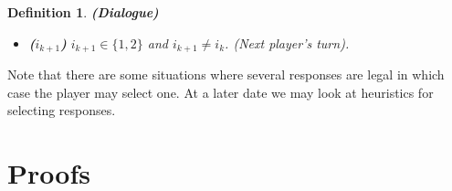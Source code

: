 \documentclass{blue-book}
\newtheorem{definition}{Definition}
\newcommand{\drule}[3]{\ensuremath{#1:#2 \rightarrow #3}}
\begin{document}
\begin{definition}{\bf (Dialogue)}
\begin{itemize}
\begin{enumerate}
\begin{itemize}
\item there exists a $T \in {\cal T}_{i_k}$ such that $t$ is unprovable in $T$ and,
\item $t \in Y_{{i_k}j}$  (Player ${i_k}$ identifies a term $t$ that it does not believe and it has established the other does  and asks why).
\end{itemize}
\item $stmt_{k + 1} = \mathit{different\_fact}(t, j, {i_k})$ is legal iff $t \in F_{{i_k}j}$ and $t \not\in F_{i_k}$ (Player ${i_k}$ has identified that $t$ was an initial fact for Player $j$ but not for Player ${i_k}$)
\item $stmt_{k + 1} = \mathit{different\_fact}(t, {i_k}, j)$ is legal iff  $t \in N_{{i_k}j}$ and $t \in F_{i_k}$  (Player ${i_k}$ has identified that $t$ was an initial fact for Player ${i_k}$ but not for Player $j$)
\item $stmt_{k+1} = \mathit{different\_rule}(l, j, {i_k})$ is legal iff $l \in YR_{{i_k}j}$ and there is no rule $\drule{l}{A}{C} \in R_{i_k}$ (Player ${i_k}$ has identified that $l$ is a rule for  Player $j$ but not for Player ${i_k}$)
\item no other statements are legal.
\end{enumerate}
\item {\bf ($i_{k+1}$)} $i_{k + 1} \in \{1, 2\}$ and $i_{k + 1} \neq i_k$.  (Next player's turn).
\end{itemize}
\end{definition}

Note that there are some situations where several responses are legal in which case the player may select one.  At a later date we may look at heuristics for selecting responses.

\section{Proofs}
\end{document}
